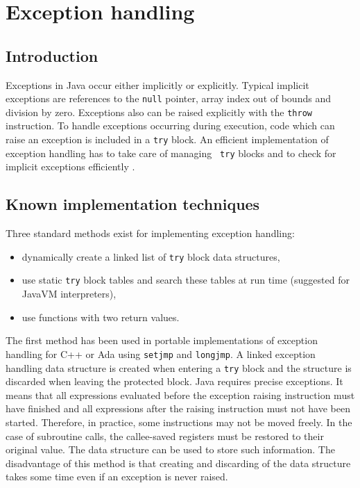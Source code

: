 \section{Exception handling}

\subsection{Introduction}

Exceptions in Java occur either implicitly or explicitly. Typical
implicit exceptions are references to the {\tt null} pointer, array
index out of bounds and division by zero. Exceptions also can be
raised explicitly with the {\tt throw} instruction. To handle
exceptions occurring during execution, code which can raise an
exception is included in a {\tt try} block. An efficient
implementation of exception handling has to take care of managing {\tt
try} blocks and to check for implicit exceptions efficiently .


\subsection{Known implementation techniques}

Three standard methods exist for implementing exception handling:

\begin{itemize}

\item dynamically create a linked list of {\tt try} block data
      structures,

\item use static {\tt try} block tables and search these tables at run
      time (suggested for JavaVM interpreters),

\item use functions with two return values.

\end{itemize}

The first method has been used in portable implementations of
exception handling for C++ \cite{Cameron+92} or Ada \cite{Giering+94}
using {\tt setjmp} and {\tt longjmp}. A linked exception handling data
structure is created when entering a {\tt try} block and the structure
is discarded when leaving the protected block. Java requires precise
exceptions. It means that all expressions evaluated before the
exception raising instruction must have finished and all expressions
after the raising instruction must not have been started. Therefore,
in practice, some instructions may not be moved freely. In the case of
subroutine calls, the callee-saved registers must be restored to their
original value. The data structure can be used to store such
information. The disadvantage of this method is that creating and
discarding of the data structure takes some time even if an exception
is never raised.

